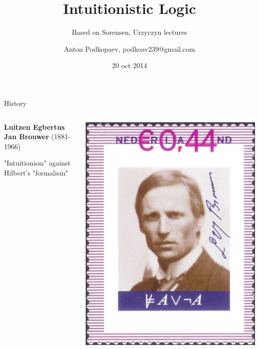 \documentclass[sans]{beamer}
\begin{document}
\title
[Intuitionistic Logic]
{Intuitionistic Logic}

\subtitle{Based on Sorensen, Urzyczyn lectures}

\author
[Podkopaev]{Anton Podkopaev, podkoav239@gmail.com}
\date [20-10-14]{20 oct 2014}

\begin{frame}[plain]
	\titlepage
\end{frame}

\begin{frame}{History}
  \begin{columns}

  \begin{column}{0.5\linewidth}
    \textbf{Luitzen Egbertus Jan Brouwer} (1881-1966)

    \vfill

    "Intuitionism" against Hilbert's "formalism"
  \end{column}

  \begin{column}{0.5\linewidth}
    \includegraphics[width = \linewidth]{images/brouwer.jpg}
  \end{column}

  \end{columns}
\end{frame}
\end{document}
